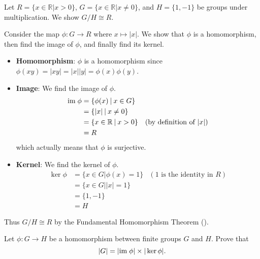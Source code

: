 \begin{example}
    Let $R = \{x \in \mathbb{R} \vert x > 0\}$, $G = \{x \in \mathbb{R} \vert x \neq 0\}$, and $H = \{1, -1\}$ be groups under multiplication. We show $G / H \cong R$.

    Consider the map $\phi: G \to R$ where $x \mapsto |x|$. We show that $\phi$ is a homomorphism, then find the image of $\phi$, and finally find its kernel.

    \newpage

    \begin{itemize}
        \item \textbf{Homomorphism}: $\phi$ is a homomorphism since $\phi(xy) = |xy| = |x||y| = \phi(x)\phi(y)$.
        \item \textbf{Image}: We find the image of $\phi$.
        \begin{align*}
            \im\phi &= \{\phi(x) \vert x \in G\}\\
            &= \{|x| \vert x \neq 0\}\\
            &= \{x \in \mathbb{R} \vert x > 0\} & (\text{by definition of } |x|)\\
            &= R
        \end{align*}
        which actually means that $\phi$ is surjective.
        \item \textbf{Kernel}: We find the kernel of $\phi$.
        \begin{align*}
            \ker\phi &= \{x \in G \vert \phi(x) = 1\} & (1 \text{ is the identity in } R)\\
            &= \{x \in G \vert |x| = 1\}\\
            &= \{1, -1\}\\
            &= H
        \end{align*}
    \end{itemize}
    Thus $G/H \cong R$ by the Fundamental Homomorphism Theorem ().
\end{example}

\begin{exercise}
    Let $\phi: G \to H$ be a homomorphism between finite groups $G$ and $H$. Prove that
    \[
        |G| = |\mathrm{im}\; \phi|\times|\ker \phi|.
    \]
\end{exercise}

